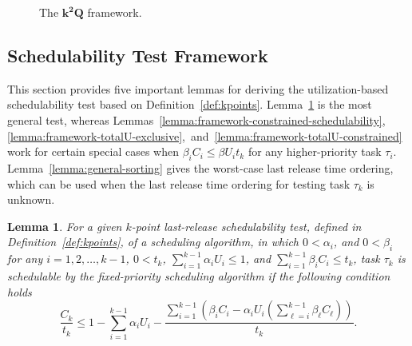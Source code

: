 \documentclass[10pt,conference]{IEEEtran}
\newcommand{\frameworkkq}[1]{$\mathbf{k^2Q}$}
\newtheorem{lemma}{Lemma}
\begin{document}
\begin{figure}[t]
\begin{center}
	\end{center}
\vspace{-2mm}
\caption{The \frameworkkq{} framework. }
\label{fig:framework}
\end{figure}

\subsection{Schedulability Test Framework}

This section provides five important lemmas for deriving the
utilization-based schedulability test based on
Definition~\ref{def:kpoints}. Lemma~\ref{lemma:framework-general-schedulability}
is the most general test, whereas
Lemmas~\ref{lemma:framework-constrained-schedulability},
\ref{lemma:framework-totalU-exclusive},~and~\ref{lemma:framework-totalU-constrained} work for certain special
cases when $\beta_i C_i \leq \beta U_i t_k$ for any higher-priority
task $\tau_i$. Lemma~\ref{lemma:general-sorting} gives the worst-case last release time ordering, 
which can be used when the last release time ordering for testing task $\tau_k$ is unknown.
  
\begin{lemma}
\label{lemma:framework-general-schedulability}
For a given $k$-point last-release schedulability test, defined in
Definition~\ref{def:kpoints}, of a scheduling 
algorithm,
in which $0 < \alpha_i$, and $0 < \beta_i$ for any
$i=1,2,\ldots,k-1$, $0 < t_k$, $\sum_{i=1}^{k-1}\alpha_i U_i \leq 1$, and $\sum_{i=1}^{k-1}
\beta_i C_i \leq t_k$, task $\tau_k$ is schedulable by the
fixed-priority scheduling
algorithm if the following condition holds
\begin{equation}
\label{eq:schedulability-general}
\frac{C_k}{t_k} \leq 1 - \sum_{i=1}^{k-1}\alpha_i U_i - \frac{\sum_{i=1}^{k-1} (\beta_i C_i - \alpha_i U_i (\sum_{\ell=i}^{k-1}  \beta_\ell C_\ell) )}{t_k}.
\end{equation}
\end{lemma}
\end{document}
